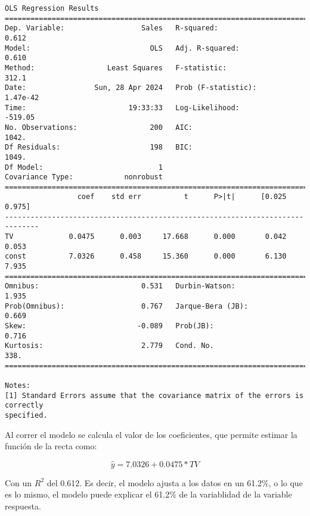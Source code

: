 \documentclass[11pt]{article}
\begin{document}
    \begin{Verbatim}[commandchars=\\\{\}]
                            OLS Regression Results
==============================================================================
Dep. Variable:                  Sales   R-squared:                       0.612
Model:                            OLS   Adj. R-squared:                  0.610
Method:                 Least Squares   F-statistic:                     312.1
Date:                Sun, 28 Apr 2024   Prob (F-statistic):           1.47e-42
Time:                        19:33:33   Log-Likelihood:                -519.05
No. Observations:                 200   AIC:                             1042.
Df Residuals:                     198   BIC:                             1049.
Df Model:                           1
Covariance Type:            nonrobust
==============================================================================
                 coef    std err          t      P>|t|      [0.025      0.975]
------------------------------------------------------------------------------
TV             0.0475      0.003     17.668      0.000       0.042       0.053
const          7.0326      0.458     15.360      0.000       6.130       7.935
==============================================================================
Omnibus:                        0.531   Durbin-Watson:                   1.935
Prob(Omnibus):                  0.767   Jarque-Bera (JB):                0.669
Skew:                          -0.089   Prob(JB):                        0.716
Kurtosis:                       2.779   Cond. No.                         338.
==============================================================================

Notes:
[1] Standard Errors assume that the covariance matrix of the errors is correctly
specified.
    \end{Verbatim}

    Al correr el modelo se calcula el valor de los coeficientes, que permite
estimar la función de la recta como:

\[\hat{y} = 7.0326 + 0.0475*TV\]

Con un \(R^2\) del 0.612. Es decir, el modelo ajusta a los datos en un
61.2\%, o lo que es lo mismo, el modelo puede explicar el 61.2\% de la
variablidad de la variable respuesta.
\end{document}
